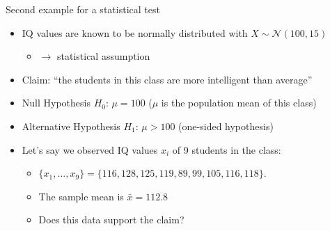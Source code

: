\begin{frame}[c]{Second example for a statistical test}

\begin{itemize}
\item IQ values are known to be normally distributed with $X \sim
\mathcal{N}(100,15)$
\begin{itemize}
\item$\to$ statistical assumption
\end{itemize}
\item Claim: \alert{``the students in this class are more intelligent
than average''}
\bigskip
\pause
\item \alert{Null Hypothesis $H_0$}: $\mu=100$ ($\mu$ is the population
mean of this class)
\item \alert{Alternative Hypothesis $H_1$}: $\mu>100$ (\alert{one-sided} hypothesis)

\bigskip
\pause

\item Let's say we observed IQ values $x_i$ of 9 students in the class:
\begin{itemize}
\item $\{x_1,\dots,x_9\} = \{116, 128, 125, 119, 89, 99, 105, 116, 118\}$.
\item The \alert{sample mean} is $\bar{x}=112.8$
\item Does this data support the claim?
\end{itemize}	

\end{itemize}	

\end{frame}
